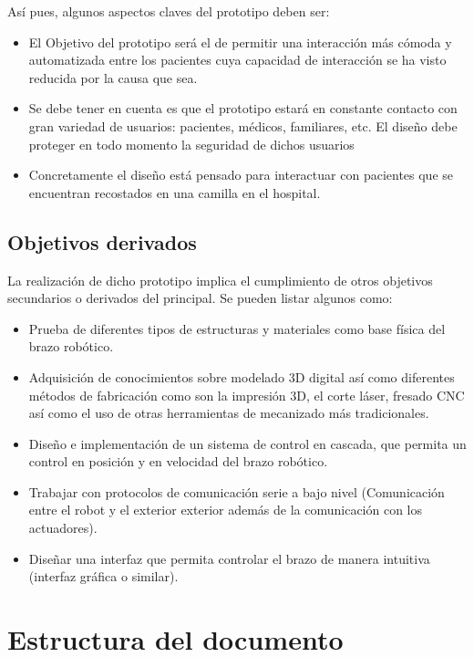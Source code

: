 Así pues, algunos aspectos claves del prototipo deben ser:
\begin{itemize}
    \item El Objetivo del prototipo será el de permitir una interacción más cómoda y automatizada entre los pacientes cuya capacidad de interacción se ha visto reducida por la causa que sea.
    \item Se debe tener en cuenta es que el prototipo estará en constante contacto con gran variedad de usuarios: pacientes, médicos, familiares, etc. El diseño debe proteger en todo momento la seguridad de dichos usuarios
    \item Concretamente el diseño está pensado para interactuar con pacientes que se encuentran recostados en una camilla en el hospital.
\end{itemize}

\subsection{Objetivos derivados}

La realización de dicho prototipo implica el cumplimiento de otros objetivos secundarios o derivados del principal. Se pueden listar algunos como:
\begin{itemize}
    \item Prueba de diferentes tipos de estructuras y materiales como base física del brazo robótico.
    \item Adquisición de conocimientos sobre modelado 3D digital así como diferentes métodos de fabricación como son la impresión 3D, el corte láser, fresado CNC así como el uso de otras herramientas de mecanizado más tradicionales.
    \item Diseño e implementación de un sistema de control en cascada, que permita un control en posición y en velocidad del brazo robótico.
    \item Trabajar con protocolos de comunicación serie a bajo nivel (Comunicación entre el robot y el exterior exterior además de la comunicación con los actuadores).
    \item Diseñar una interfaz que permita controlar el brazo de manera intuitiva (interfaz gráfica o similar).
\end{itemize}


\section{Estructura del documento}


